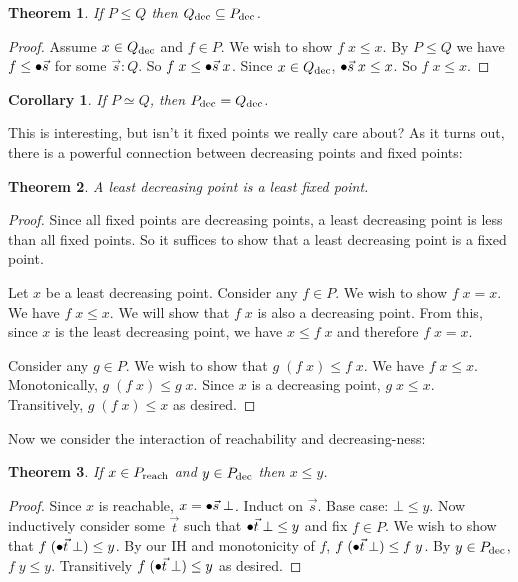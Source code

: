 \documentclass{article}
\newcommand{\todo}[1]{{\color{red}{#1}}}
\newtheorem{theorem}{Theorem}
\newtheorem{corollary}{Corollary}
\begin{document}
\begin{theorem}
  If $P \le Q$ then ${Q}_{\text{dec}} \subseteq {P}_{\text{dec}}$.
  \label{thm:dec-antitone}
\end{theorem}

\begin{proof}
  Assume $x \in {Q}_{\text{dec}}$ and $f \in P$. We wish to show $f\;x \le x$. By $P
  \le Q$ we have $f \le {\bullet\vec{s}}$ for some $\vec{s} : Q$. So $f\;x \le
  {\bullet\vec{s}}\;x$. Since $x \in {Q}_{\text{dec}}$, ${\bullet\vec{s}}\;x \le x$. So $f\; x \le x$.
\end{proof}

\todo{Maybe the ordering on programs is the opposite of what it should be?}

\begin{corollary}
  If $P \simeq Q$, then ${P}_{\text{dec}} = {Q}_{\text{dec}}$.
  \label{cor:simeq->dec}
\end{corollary}

This is interesting, but isn't it fixed points we really care about? As it turns
out, there is a powerful connection between decreasing points and fixed points:

\begin{theorem}
  A least decreasing point is a least fixed point.
\end{theorem}

\begin{proof}
  Since all fixed points are decreasing points, a least decreasing point is less
  than all fixed points. So it suffices to show that a least decreasing point is
  a fixed point.

  Let $x$ be a least decreasing point. Consider any $f \in P$. We wish to show
  $f\;x = x$. We have $f\; x \le x$. We will show that $f\;x$ is also a
  decreasing point. From this, since $x$ is the least decreasing point, we have
  $x \le f\;x$ and therefore $f\;x = x$.

  Consider any $g \in P$. We wish to show that $g\;(f\;x) \le f\; x$. We have
  $f\;x \le x$. Monotonically, $g\;(f\;x) \le g\;x$. Since $x$ is a decreasing
  point, $g\;x \le x$. Transitively, $g\;(f\;x) \le x$ as desired.
\end{proof}

Now we consider the interaction of reachability and decreasing-ness:

\begin{theorem}
  If $x \in {P}_{\text{reach}}$ and $y \in {P}_{\text{dec}}$ then $x \le y$.
  \label{thm:reachable<=dec}
\end{theorem}

\begin{proof}
  Since $x$ is reachable, $x = {\bullet\vec{s}}\; \bot$. Induct on $\vec{s}$. Base case:
  $\bot \le y$. Now inductively consider some $\vec{t}$ such that ${\bullet\vec{t}}\;
  \bot \le y$ and fix $f \in P$. We wish to show that $f\; ({\bullet\vec{t}}\; \bot) \le
  y$. By our IH and monotonicity of $f$, $f\;({\bullet\vec{t}}\; \bot) \le f\; y$. By $y
  \in {P}_{\text{dec}}$, $f\;y \le y$. Transitively $f\; ({\bullet\vec{t}}\; \bot) \le y$ as
  desired.
\end{proof}
\end{document}
